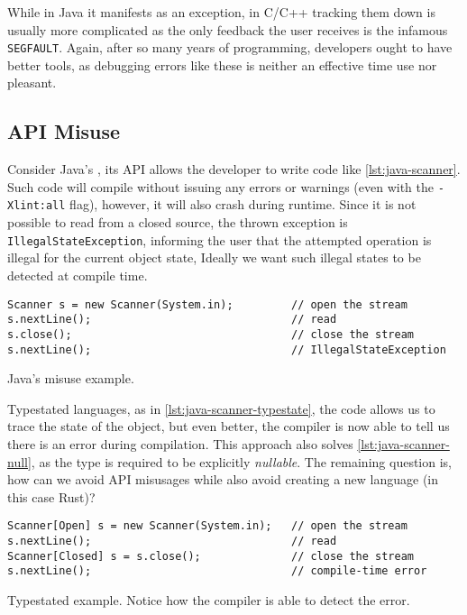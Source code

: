 While in Java it manifests as an exception,
in C/C++ tracking them down is usually more complicated as the only feedback the user receives is the infamous \texttt{SEGFAULT}.
Again, after so many years of programming, developers ought to have better tools,
as debugging errors like these is neither an effective time use nor pleasant.

\subsection{API Misuse}

Consider Java's , its API allows the developer to write code like \autoref{lst:java-scanner}.
Such code will compile without issuing any errors or warnings (even with the \texttt{-Xlint:all} flag),
however, it will also crash during runtime.
Since it is not possible to read from a closed source, the thrown exception is \texttt{IllegalStateException},
informing the user that the attempted operation is illegal for the current object state,
Ideally we want such illegal states to be detected at compile time.

\begin{listing}
    \begin{verbatim}
Scanner s = new Scanner(System.in);         // open the stream
s.nextLine();                               // read
s.close();                                  // close the stream
s.nextLine();                               // IllegalStateException
    \end{verbatim}
    \caption{Java's  misuse example.}
    \label{lst:java-scanner}
\end{listing}

Typestated languages, as in \autoref{lst:java-scanner-typestate},
the code allows us to trace the state of the object, but even better,
the compiler is now able to tell us there is an error during compilation.
This approach also solves \autoref{lst:java-scanner-null}, as the type is required to be explicitly \emph{nullable}.
The remaining question is, how can we avoid API misusages while also avoid creating a new language (in this case Rust)?

\begin{listing}
    \begin{verbatim}
Scanner[Open] s = new Scanner(System.in);   // open the stream
s.nextLine();                               // read
Scanner[Closed] s = s.close();              // close the stream
s.nextLine();                               // compile-time error
    \end{verbatim}
    \caption{
        Typestated  example.
        Notice how the compiler is able to detect the error.
    }
    \label{lst:java-scanner-typestate}
\end{listing}

